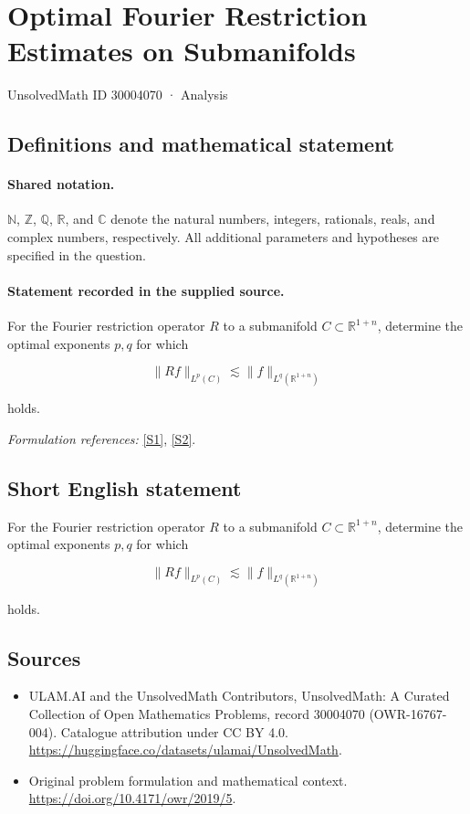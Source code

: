 \documentclass[11pt]{article}
\newcommand{\sref}[2]{\hyperlink{source:#1:#2}{[S#2]}}
\begin{document}
\setcounter{section}{30004069}
\section{Optimal Fourier Restriction Estimates on Submanifolds}\label{30004070}
{\small UnsolvedMath ID 30004070 · Analysis}
\subsection{Definitions and mathematical statement}

\paragraph{Shared notation.}$\mathbb N$, $\mathbb Z$, $\mathbb Q$, $\mathbb R$, and $\mathbb C$ denote the natural numbers, integers, rationals, reals, and complex numbers, respectively. All additional parameters and hypotheses are specified in the question.


\paragraph{Statement recorded in the supplied source.}
For the Fourier restriction operator $R$ to a submanifold $C\subset\mathbb R^{1+n}$, determine the optimal exponents $p,q$ for which

$$\lVert Rf\rVert_{L^p(C)}\lesssim\lVert f\rVert_{L^q(\mathbb R^{1+n})}$$

holds.
\par\smallskip\textit{Formulation references:} \sref{30004070}{1}, \sref{30004070}{2}.
\subsection{Short English statement}
For the Fourier restriction operator $R$ to a submanifold $C\subset\mathbb R^{1+n}$, determine the optimal exponents $p,q$ for which

$$\lVert Rf\rVert_{L^p(C)}\lesssim\lVert f\rVert_{L^q(\mathbb R^{1+n})}$$

holds.
\subsection{Sources}
\begin{itemize}
\item[\hypertarget{source:30004070:1}{S1}] ULAM.AI and the UnsolvedMath Contributors, UnsolvedMath: A Curated Collection of Open Mathematics Problems, record 30004070 (OWR-16767-004). Catalogue attribution under CC BY 4.0.
\url{https://huggingface.co/datasets/ulamai/UnsolvedMath}.
\item[\hypertarget{source:30004070:2}{S2}] Original problem formulation and mathematical context.
\url{https://doi.org/10.4171/owr/2019/5}.
\end{itemize}
\label{end:30004070}
\end{document}
